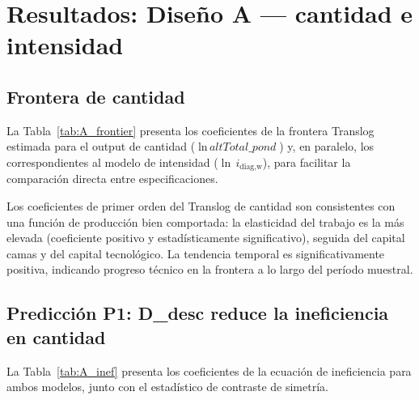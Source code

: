 
\section{Resultados: Diseño A — cantidad e intensidad}
\label{sec:resultados_A}

\subsection{Frontera de cantidad}
\label{subsec:frontera_cantidad}

La Tabla~\ref{tab:A_frontier} presenta los coeficientes de la frontera Translog estimada para el output de cantidad (\(\ln\,\textit{altTotal\_pond}\)) y, en paralelo, los correspondientes al modelo de intensidad (\(\ln\,i_{\text{diag,w}}\)), para facilitar la comparación directa entre especificaciones.

\begin{table}[htbp]
\centering
\caption{Diseño A: coeficientes de la frontera de producción (Translog)}
\label{tab:A_frontier}
\small

\end{table}

Los coeficientes de primer orden del Translog de cantidad son consistentes con una función de producción bien comportada: la elasticidad del trabajo es la más elevada (coeficiente positivo y estadísticamente significativo), seguida del capital camas y del capital tecnológico. La tendencia temporal es significativamente positiva, indicando progreso técnico en la frontera a lo largo del período muestral.

\subsection{Predicción P1: D\_desc reduce la ineficiencia en cantidad}
\label{subsec:P1}

La Tabla~\ref{tab:A_inef} presenta los coeficientes de la ecuación de ineficiencia para ambos modelos, junto con el estadístico de contraste de simetría.

\begin{table}[htbp]
\centering
\caption{Diseño A: ecuación de ineficiencia — coeficientes y contrastes de asimetría}
\label{tab:A_inef}
\small

\end{table}

